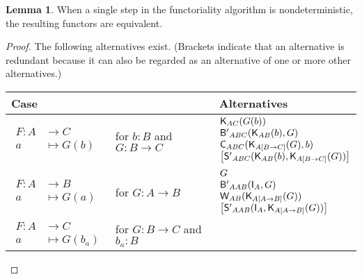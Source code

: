 \documentclass[a4paper]{article}
\theoremstyle{definition}
\newtheorem{lemma}[definition]{Lemma}
\theoremstyle{remark}
\newcommand{\nm}{\mathsf}
\newcommand{\combinator}{\nm}
\newcommand{\idFun}{\combinator{I}}
\newcommand{\constFun}{\combinator{K}}
\newcommand{\compFun}{\combinator{B'}}
\newcommand{\swapFun}{\combinator{C}}
\newcommand{\dupFun}{\combinator{W}}
\newcommand{\substFun}{\combinator{S'}}
\begin{document}
\vspace{1ex}
\begin{lemma}
  \label{lem:functoriality-step-equiv}
  When a single step in the functoriality algorithm is nondeterministic, the resulting
  functors are equivalent.
\end{lemma}
\vspace{-1ex}
\begin{proof}
  The following alternatives exist.
  (Brackets indicate that an alternative is redundant because it can also be regarded as an
  alternative of one or more other alternatives.)

  \begin{tabular}{ll|l}
    Case & & Alternatives\\
    \hline\hline
    \rule{0pt}{3em}
    $\begin{aligned}
      F : A &\to     C\\
          a &\mapsto G(b)
    \end{aligned}$ &
    \parbox{3cm}{for $b : B$ \\ and $G : B \to C$} &
    $\begin{array}{@{}l@{}}
      \constFun_{AC}(G(b))\\
      \compFun_{ABC}(\constFun_{AB}(b),G)\\
      \swapFun_{ABC}(\constFun_{A[B{\to}C]}(G),b)\\
      \left[\substFun_{ABC}(\constFun_{AB}(b),\constFun_{A[B{\to}C]}(G))\right]
    \end{array}$\\
    \hline
    \rule{0pt}{3em}
    $\begin{aligned}
      F : A &\to     B\\
          a &\mapsto G(a)
    \end{aligned}$ &
    for $G : A \to B$ &
    $\begin{array}{@{}l@{}}
      G\\
      \compFun_{AAB}(\idFun_A,G)\\
      \dupFun_{AB}(\constFun_{A[A{\to}B]}(G))\\
      \left[\substFun_{AAB}(\idFun_A,\constFun_{A[A{\to}B]}(G))\right]
    \end{array}$\\
    \hline
    \rule{0pt}{2em}
    $\begin{aligned}
      F : A &\to     C\\
          a &\mapsto G(b_a)
    \end{aligned}$ &
    \parbox{3cm}{for $G : B \to C$ \\ and $b_a : B$} &

\end{tabular}
\end{proof}
\end{document}
